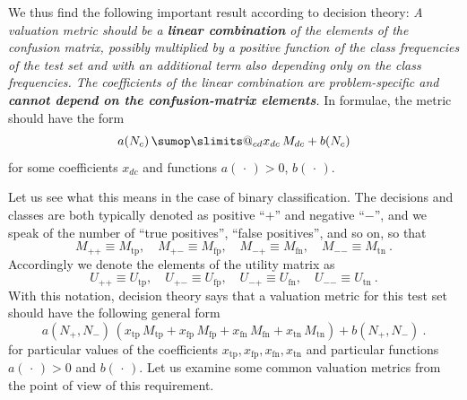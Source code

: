 \documentclass[\ifafour a4paper,12pt,\else a5paper,10pt,\fi%
onecolumn,oneside,article,%
british%
]{memoir}
\makeatletter
\theoremstyle{remark}
\theoremstyle{innote}
\def\sum{\DOTSI\sumop\slimits@}
\newcommand*{\dotv}{\mathord{\,\cdot\,}}%
\renewcommand*{\|}[1][]{\nonscript\:#1\vert\nonscript\:\mathopen{}}
\newcommand*{\Po}{\mathord{+}}
\newcommand*{\Ne}{\mathord{-}}
\newcommand*{\tp}{\textrm{tp}}
\newcommand*{\fp}{\textrm{fp}}
\newcommand*{\fn}{\textrm{fn}}
\newcommand*{\tn}{\textrm{tn}}
\makeatother
\begin{document}
We thus find the following important result according to decision theory: \emph{A valuation metric should be a \textbf{linear combination} of the elements of the confusion matrix, possibly multiplied by a positive function of the class frequencies of the test set and with an additional term also depending only on the class frequencies. The coefficients of the linear combination are problem-specific and \textbf{cannot depend on the confusion-matrix elements}.} In formulae, the metric should have the form
\begin{equation}
  \label{eq:general_valuation_metric}
  a(N_{c})\, \sum_{cd} x_{dc}\, M_{dc} +  b(N_{c})
\end{equation}
for some coefficients $x_{dc}$ and functions $a(\dotv)>0$,\; $b(\dotv)$.

Let us see what this means in the case of binary classification. The decisions and classes are both typically denoted as positive \enquote{$\Po$} and negative \enquote{$\Ne$}, and we speak of the number of \enquote{true positives}, \enquote{false positives}, and so on, so that
\begin{equation*}
  M_{\Po\Po} \equiv M_{\tp}, \quad
  M_{\Po\Ne} \equiv M_{\fp}, \quad
  M_{\Ne\Po} \equiv M_{\fn}, \quad
  M_{\Ne\Ne} \equiv M_{\tn} \ .
\end{equation*}
Accordingly we denote the elements of the utility matrix as
\begin{equation*}
  U_{\Po\Po} \equiv U_{\tp}, \quad
  U_{\Po\Ne} \equiv U_{\fp}, \quad
  U_{\Ne\Po} \equiv U_{\fn}, \quad
  U_{\Ne\Ne} \equiv U_{\tn} \ .
\end{equation*}
With this notation, decision theory says that a valuation metric for this test set should have the following general form
\begin{equation}
  \label{eq:utility_testset_binary}
  a(N_{\Po},N_{\Ne})\,
  (x_{\tp}\, M_{\tp} + x_{\fp}\, M_{\fp} +
 x_{\fn}\, M_{\fn} + x_{\tn}\, M_{\tn}) +
  b(N_{\Po},N_{\Ne}) \ .
\end{equation}
for particular values of the coefficients $x_{\tp}, x_{\fp}, x_{\fn}, x_{\tn}$ and particular functions $a(\dotv)>0$ and $b(\dotv)$. Let us examine some common valuation metrics from the point of view of this requirement.
\end{document}
